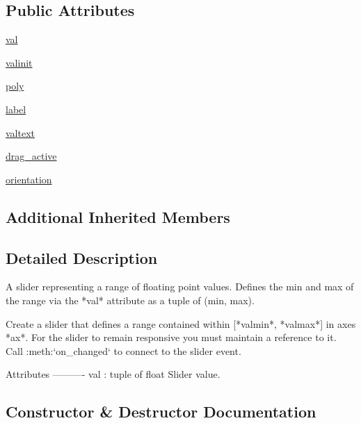 \subsection*{Public Attributes}
\begin{DoxyCompactItemize}
\item 
\hyperlink{classmatplotlib_1_1widgets_1_1RangeSlider_a70cbec0a637533482703b3acaa6f2aef}{val}
\item 
\hyperlink{classmatplotlib_1_1widgets_1_1RangeSlider_a9c1d5f8fd0a3032655e02f65198455c7}{valinit}
\item 
\hyperlink{classmatplotlib_1_1widgets_1_1RangeSlider_a19c07aa7d22ddfc36512b2fbb3d76aa0}{poly}
\item 
\hyperlink{classmatplotlib_1_1widgets_1_1RangeSlider_a14031aac72ac612a9b731dfa5ae9adaf}{label}
\item 
\hyperlink{classmatplotlib_1_1widgets_1_1RangeSlider_ac476557d97a8626833d8fa91f2bcb453}{valtext}
\item 
\hyperlink{classmatplotlib_1_1widgets_1_1RangeSlider_a242f63a00bca955d16fda1590e3a722e}{drag\+\_\+active}
\item 
\hyperlink{classmatplotlib_1_1widgets_1_1RangeSlider_a1f59a8a85f45ba8048209d134b2a4711}{orientation}
\end{DoxyCompactItemize}
\subsection*{Additional Inherited Members}


\subsection{Detailed Description}
\begin{DoxyVerb}A slider representing a range of floating point values. Defines the min and
max of the range via the *val* attribute as a tuple of (min, max).

Create a slider that defines a range contained within [*valmin*, *valmax*]
in axes *ax*. For the slider to remain responsive you must maintain a
reference to it. Call :meth:`on_changed` to connect to the slider event.

Attributes
----------
val : tuple of float
    Slider value.
\end{DoxyVerb}
 

\subsection{Constructor \& Destructor Documentation}
\mbox{\label{classmatplotlib_1_1widgets_1_1RangeSlider_aa02e80e894adeff6d0251821a64e10f2}} 
